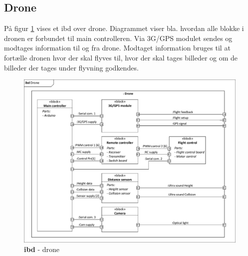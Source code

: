 \subsection{Drone}

På figur \ref{fig:ibd_drone} vises et ibd over drone. Diagrammet viser bla. hvordan alle blokke i dronen er forbundet til main controlleren. Via 3G/GPS modulet sendes og modtages information til og fra drone. Modtaget information bruges til at fortælle dronen hvor der skal flyves til, hvor der skal tages billeder og om de billeder der tages under flyvning godkendes. 

\begin{figure}[H]
\centering
\includegraphics[width=1\textwidth]{Billeder/IBD/ibd2_drone.pdf}
\vspace{-0.5cm}
\caption{\textbf{ibd} - drone}
\label{fig:ibd_drone}
\end{figure}

